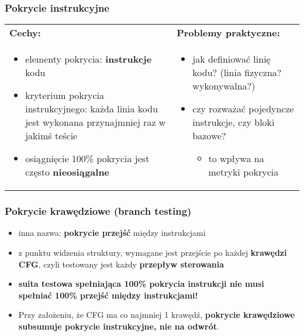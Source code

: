 \documentclass[../main.tex]{subfiles}
\begin{document}
    \subsubsection{Pokrycie instrukcyjne}
    \begin{table}[H]
        \begin{center}
            \begin{tabular}{p{8cm} p{8cm}}
                \textbf{Cechy:} & \textbf{ Problemy praktyczne:}\\
                \begin{itemize}
                    \item elementy pokrycia: \textbf{instrukcje} kodu
                    \item kryterium pokrycia instrukcyjnego: każda linia kodu jest wykonana
                    przynajmniej raz w jakimś teście
                    \item osiągnięcie 100\% pokrycia jest często \textbf{nieosiągalne}
                \end{itemize}
                &
                \begin{itemize}
                    \item jak definiować linię kodu? (linia fizyczna? wykonywalna?)
                    \item czy rozważać pojedyncze instrukcje, czy bloki bazowe?
                    \begin{itemize}
                        \item to wpływa na metryki pokrycia
                    \end{itemize}
                \end{itemize}
            \end{tabular}
        \end{center}
    \end{table}




    \subsubsection{Pokrycie krawędziowe (branch testing)}
    \begin{itemize}
        \item inna nazwa: \textbf{pokrycie przejść} między instrukcjami
        \item z punktu widzenia struktury, wymagane jest przejście po każdej
        \textbf{krawędzi CFG}, czyli testowany jest każdy \textbf{przepływ sterowania}
        \item \textbf{suita testowa spełniająca 100\% pokrycia instrukcji nie musi
        spełniać 100\% przejść między instrukcjami!}
        \item Przy założeniu, że CFG ma co najmniej 1 krawędź, \textbf{pokrycie
        krawędziowe subsumuje pokrycie instrukcyjne, nie na odwrót}.
    \end{itemize}
\end{document}
